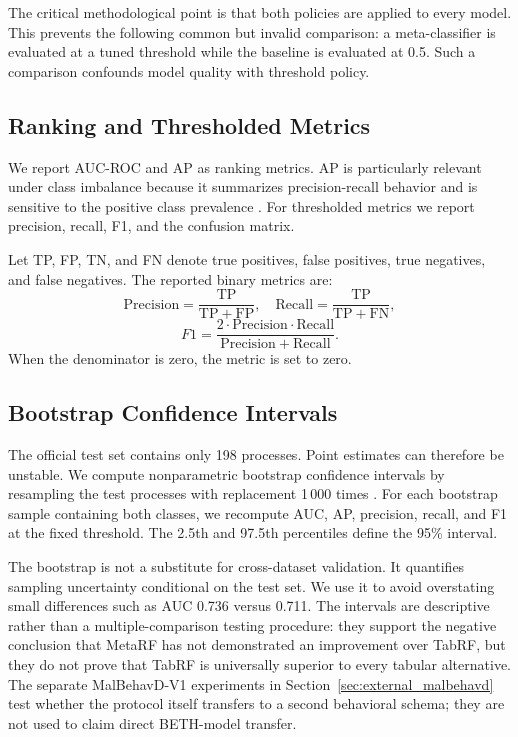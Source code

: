 \documentclass[10pt,journal,compsoc]{IEEEtran}
\begin{document}
The critical methodological point is that both policies are applied to every model. This prevents the following common but invalid comparison: a meta-classifier is evaluated at a tuned threshold while the baseline is evaluated at 0.5. Such a comparison confounds model quality with threshold policy.

\subsection{Ranking and Thresholded Metrics}

We report AUC-ROC and AP as ranking metrics. AP is particularly relevant under class imbalance because it summarizes precision-recall behavior and is sensitive to the positive class prevalence \cite{saito2015}. For thresholded metrics we report precision, recall, F1, and the confusion matrix.

Let TP, FP, TN, and FN denote true positives, false positives, true negatives, and false negatives. The reported binary metrics are:
\[
\mathrm{Precision} = \frac{\mathrm{TP}}{\mathrm{TP}+\mathrm{FP}},
\quad
\mathrm{Recall} = \frac{\mathrm{TP}}{\mathrm{TP}+\mathrm{FN}},
\]
\[
F1 = \frac{2\cdot \mathrm{Precision}\cdot \mathrm{Recall}}{\mathrm{Precision}+\mathrm{Recall}}.
\]
When the denominator is zero, the metric is set to zero.

\subsection{Bootstrap Confidence Intervals}

The official test set contains only 198 processes. Point estimates can therefore be unstable. We compute nonparametric bootstrap confidence intervals by resampling the test processes with replacement 1\,000 times \cite{efron1994}. For each bootstrap sample containing both classes, we recompute AUC, AP, precision, recall, and F1 at the fixed threshold. The 2.5th and 97.5th percentiles define the 95\% interval.

The bootstrap is not a substitute for cross-dataset validation. It quantifies sampling uncertainty conditional on the test set. We use it to avoid overstating small differences such as AUC 0.736 versus 0.711. The intervals are descriptive rather than a multiple-comparison testing procedure: they support the negative conclusion that MetaRF has not demonstrated an improvement over TabRF, but they do not prove that TabRF is universally superior to every tabular alternative. The separate MalBehavD-V1 experiments in Section~\ref{sec:external_malbehavd} test whether the protocol itself transfers to a second behavioral schema; they are not used to claim direct BETH-model transfer.
\end{document}
